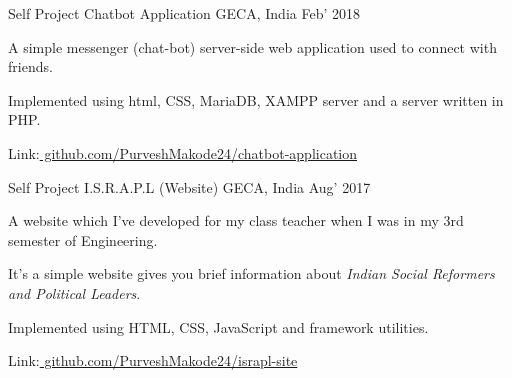 

\begin{cventries}

  \cventry
    {Self Project}  
    {Chatbot Application} %
    {GECA, India} %
    {Feb’ 2018} %
    {
      \begin{cvitems} %
      	\item {A simple messenger (chat-bot) server-side web application used to connect with friends.}
        \item {Implemented using html, CSS, MariaDB, XAMPP server and a server written in PHP.}
        \item {Link:\href{https://github.com/PurveshMakode24/chatbot-application}{ github.com/PurveshMakode24/chatbot-application}} 
      \end{cvitems}
    }

  \cventry
    {Self Project} %
    {I.S.R.A.P.L (Website)} %
    {GECA, India} %
    {Aug’ 2017} %
    {
      \begin{cvitems} %
        \item {A website which I’ve developed for my class teacher when I was in my 3rd semester of Engineering.}
        \item {It’s a simple website gives you brief information about {\em Indian Social Reformers and Political Leaders}.}
        \item {Implemented using HTML, CSS, JavaScript and framework utilities.}
        \item {Link:\href{https://github.com/PurveshMakode24/israpl-site}{ github.com/PurveshMakode24/israpl-site}}
      \end{cvitems}
    }
\end{cventries}
